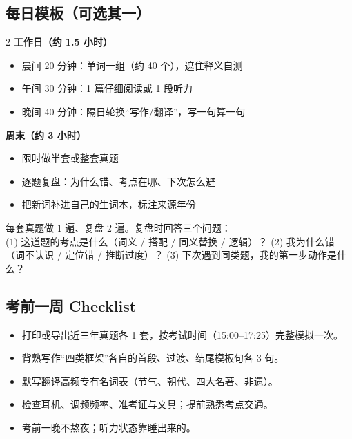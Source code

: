 \subsection{每日模板（可选其一）}

\begin{multicols}{2}
\textbf{工作日（约 1.5 小时）}
\begin{itemize}
  \item 晨间 20 分钟：单词一组（约 40 个），遮住释义自测
  \item 午间 30 分钟：1 篇仔细阅读或 1 段听力
  \item 晚间 40 分钟：隔日轮换“写作/翻译”，写一句算一句
\end{itemize}

\textbf{周末（约 3 小时）}
\begin{itemize}
  \item 限时做半套或整套真题
  \item 逐题复盘：为什么错、考点在哪、下次怎么避
  \item 把新词补进自己的生词本，标注来源年份
\end{itemize}
\end{multicols}

\begin{tipbox}[复盘比刷题更重要]
每套真题做 1 遍、复盘 2 遍。复盘时回答三个问题：\\
(1) 这道题的考点是什么（词义 / 搭配 / 同义替换 / 逻辑）？\quad
(2) 我为什么错（词不认识 / 定位错 / 推断过度）？\quad
(3) 下次遇到同类题，我的第一步动作是什么？
\end{tipbox}

\subsection{考前一周 Checklist}

\begin{itemize}
  \item 打印或导出近三年真题各 1 套，按考试时间（15:00--17:25）完整模拟一次。
  \item 背熟写作“四类框架”各自的首段、过渡、结尾模板句各 3 句。
  \item 默写翻译高频专有名词表（节气、朝代、四大名著、非遗）。
  \item 检查耳机、调频频率、准考证与文具；提前熟悉考点交通。
  \item 考前一晚不熬夜；听力状态靠睡出来的。
\end{itemize}
